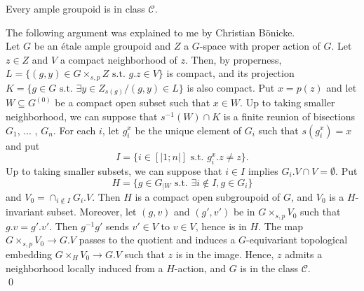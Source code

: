 \begin{prop}
Every ample groupoid is in class $\mathcal C$.
\end{prop}


\begin{dem} The following argument was explained to me by Christian Bönicke.\\ 
Let $G$ be an étale ample groupoid and $Z$ a $G$-space with proper action of $G$. Let $z\in Z$ and $V$ a compact neighborhood of $z$. Then, by properness, $L = \{(g,y)\in G\times_{s,p} Z \text{ s.t. } g.z\in V \}$ is compact, and its projection $K = \{g\in G \text{ s.t. } \exists  y\in Z_{s(g)} / (g,y)\in L\}$ is also compact. Put $x=p(z)$ and let $W\subseteq G^{(0)}$ be a compact open subset such that $x\in W$. Up to taking smaller neighborhood, we can suppose that $s^{-1}(W)\cap K$ is a finite reunion of bisections $G_1$, ... , $G_n$. For each $i$, let $g_i^x$ be the unique element of $G_i$ such that $s(g_i^x)=x$ and put
\[I = \{i\in [|1;n|] \text{ s.t. } g_i^x . z \neq z\}.\]
Up to taking smaller subsets, we can suppose that $i\in I$ implies $G_i. V \cap V = \emptyset$. Put 
\[H = \{g\in G_{|W} \text{ s.t. } \exists i\notin I, g\in G_i \}\]
and $V_0 = \cap_{i\notin I} G_i.V$. Then $H$ is a compact open subgroupoid of $G$, and $V_0$ is a $H$-invariant subset. Moreover, let $(g,v)$ and $(g',v')$ be in $G\times_{s,p} V_0$ such that $g.v=g'.v'$. Then $g^{-1}g'$ sends $v'\in V$ to $v\in V$, hence is in $H$. The map $G\times_{s,p} V_0\rightarrow G.V$ passes to the quotient and induces a $G$-equivariant topological embedding $G\times_H V_0 \rightarrow G.V$ such that $z$ is in the image. Hence, $z$ admits a neighborhood locally induced from a $H$-action, and $G$ is in the class $\mathcal C$.\\   
\qed
\end{dem}

